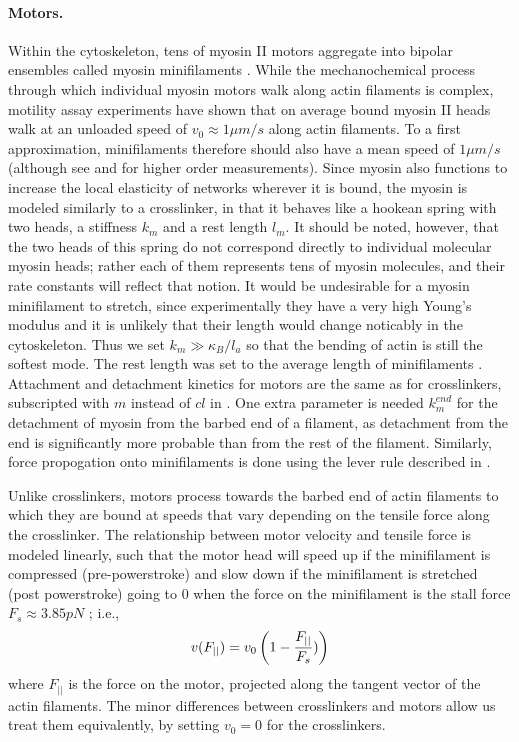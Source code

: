 \documentclass[11pt]{article}
\begin{document}
\paragraph{{\bf Motors.}}%
Within the cytoskeleton, tens of myosin II motors aggregate into bipolar ensembles called myosin minifilaments
\cite{stam2015}. While the mechanochemical process through which individual myosin motors walk along actin filaments is complex, 
motility assay experiments have shown that on average bound myosin II heads walk at an unloaded speed of $v_0\approx1\mu m/s$ along actin
filaments\cite{finer1994}. To a first approximation, minifilaments therefore should also 
have a mean speed of $1\mu m/s$ (although see \cite{stam2015} and \cite{walcott2012} for higher order measurements). 
Since myosin also functions to increase the local elasticity of networks wherever it is bound, the myosin is modeled
similarly to a crosslinker, in that it behaves like a hookean spring with two heads, a stiffness $k_{m}$ and a rest
length $l_m$. It should be noted, however, that the two heads of this spring do not correspond directly to individual
molecular myosin heads; rather each of them represents tens of myosin molecules, and their rate constants will reflect
that notion. 
It would be undesirable for a myosin minifilament to stretch, 
since experimentally they have a very high
Young's modulus and it is unlikely that their length would change noticably in the cytoskeleton. Thus we set $k_m\gg\kappa_B/l_a$
so that the bending of actin is still the softest mode. 
The rest length was set to the average length of minifilaments \cite{niederman1975}.
Attachment and detachment kinetics for motors are the same as for crosslinkers, subscripted with $m$
instead of $cl$ in . One extra parameter is needed $k_m^{end}$ for the
detachment of myosin from the barbed end of a filament, as detachment from the end is significantly more probable than
from the rest of the filament.
Similarly, force propogation onto minifilaments is done using the lever rule described in .
\par
Unlike crosslinkers, motors process towards the barbed end of actin filaments to which they are bound 
at speeds that vary depending on the tensile force along the crosslinker. 
The relationship between motor velocity and tensile force is modeled linearly, such that the motor head 
will speed up if the minifilament is
compressed (pre-powerstroke) and slow down if the minifilament is stretched (post powerstroke) going to
$0$ when the force on the minifilament is the stall force $F_s\approx 3.85pN$ \cite{nedelec2002, gordon2012}; i.e.,  
\begin{equation} 
  v(F_{||}) = v_0\left( 1-{F_{||}\over F_s}) \right)
    \label{eqn:myo_vel}
\end{equation} 
where $F_{||}$ is the force on the motor, projected along the tangent vector of the
actin filaments.
The minor differences between crosslinkers and motors allow us treat them equivalently, by 
setting $v_0 = 0$ for the crosslinkers.  
\end{document}

